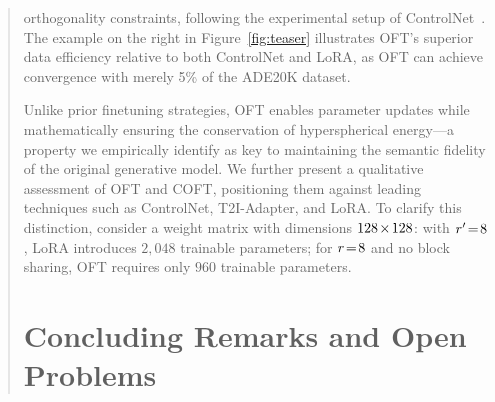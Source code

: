 \begin{itemize}[leftmargin=*,nosep]
\begin{abstract}
orthogonality constraints, following the experimental setup of ControlNet~\cite{zhang2023adding}. The example on the right in Figure~\ref{fig:teaser} illustrates OFT’s superior data efficiency relative to both ControlNet and LoRA, as OFT can achieve convergence with merely 5\% of the ADE20K dataset. \item Unlike prior finetuning strategies, OFT enables parameter updates while mathematically ensuring the conservation of hyperspherical energy—a property we empirically identify as key to maintaining the semantic fidelity of the original generative model. We further present a qualitative assessment of OFT and COFT, positioning them against leading techniques such as ControlNet, T2I-Adapter, and LoRA. To clarify this distinction, consider a weight matrix with dimensions $\thickmuskip=2mu \medmuskip=2mu 128\times 128$: with $\thickmuskip=2mu \medmuskip=2mu r'=8$, LoRA introduces $2,048$ trainable parameters; for $\thickmuskip=2mu \medmuskip=2mu r=8$ and no block sharing, OFT requires only $960$ trainable parameters. \section{Concluding Remarks and Open Problems}


\end{abstract}
\end{itemize}
